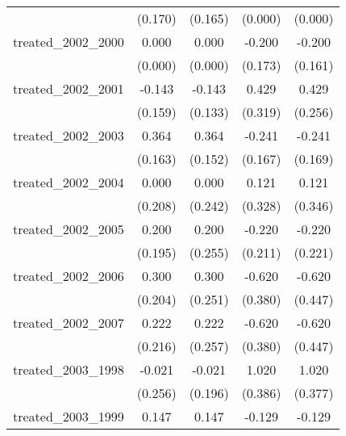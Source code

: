 {\begin{tabular}{l*{4}{c}}
            &     (0.170)         &     (0.165)         &     (0.000)         &     (0.000)         \\
[1em]
treated\_2002\_2000&       0.000         &       0.000         &      -0.200         &      -0.200         \\
            &     (0.000)         &     (0.000)         &     (0.173)         &     (0.161)         \\
[1em]
treated\_2002\_2001&      -0.143         &      -0.143         &       0.429         &       0.429         \\
            &     (0.159)         &     (0.133)         &     (0.319)         &     (0.256)         \\
[1em]
treated\_2002\_2003&       0.364\sym{*}  &       0.364\sym{*}  &      -0.241         &      -0.241         \\
            &     (0.163)         &     (0.152)         &     (0.167)         &     (0.169)         \\
[1em]
treated\_2002\_2004&       0.000         &       0.000         &       0.121         &       0.121         \\
            &     (0.208)         &     (0.242)         &     (0.328)         &     (0.346)         \\
[1em]
treated\_2002\_2005&       0.200         &       0.200         &      -0.220         &      -0.220         \\
            &     (0.195)         &     (0.255)         &     (0.211)         &     (0.221)         \\
[1em]
treated\_2002\_2006&       0.300         &       0.300         &      -0.620         &      -0.620         \\
            &     (0.204)         &     (0.251)         &     (0.380)         &     (0.447)         \\
[1em]
treated\_2002\_2007&       0.222         &       0.222         &      -0.620         &      -0.620         \\
            &     (0.216)         &     (0.257)         &     (0.380)         &     (0.447)         \\
[1em]
treated\_2003\_1998&      -0.021         &      -0.021         &       1.020\sym{**} &       1.020\sym{**} \\
            &     (0.256)         &     (0.196)         &     (0.386)         &     (0.377)         \\
[1em]
treated\_2003\_1999&       0.147         &       0.147         &      -0.129         &      -0.129         \\

\end{tabular}}
